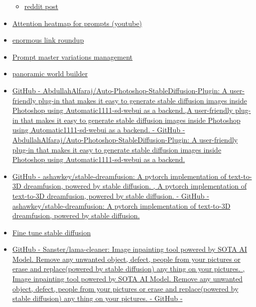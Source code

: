 \begin{itemize}
\begin{itemize}
  \item
    \href{https://www.reddit.com/r/StableDiffusion/comments/10tjzmf/instructpix2pix_is_built_straight_into_the/}{reddit
    post}
  \end{itemize}
\item
  \href{https://www.youtube.com/watch?v=XiKyEKJrTLQ}{Attention heatmap
  for prompts (youtube)}
\item
  \href{https://rentry.org/RentrySD/}{enormous link roundup}
\item
  \href{https://github.com/hoblin/prompt-master}{Prompt master
  variations management}
\item
  \href{https://huggingface.co/congazverse/worldBuilder}{panoramic world
  builder}
\item
  \href{https://github.com/abdullahalfaraj/auto-photoshop-stablediffusion-plugin}{GitHub
  - AbdullahAlfaraj/Auto-Photoshop-StableDiffusion-Plugin: A
  user-friendly plug-in that makes it easy to generate stable diffusion
  images inside Photoshop using Automatic1111-sd-webui as a backend.,A
  user-friendly plug-in that makes it easy to generate stable diffusion
  images inside Photoshop using Automatic1111-sd-webui as a backend. -
  GitHub - AbdullahAlfaraj/Auto-Photoshop-StableDiffusion-Plugin: A
  user-friendly plug-in that makes it easy to generate stable diffusion
  images inside Photoshop using Automatic1111-sd-webui as a backend.}
\item
  \href{https://github.com/ashawkey/stable-dreamfusion}{GitHub -
  ashawkey/stable-dreamfusion: A pytorch implementation of text-to-3D
  dreamfusion, powered by stable diffusion. , A pytorch implementation
  of text-to-3D dreamfusion, powered by stable diffusion. - GitHub -
  ashawkey/stable-dreamfusion: A pytorch implementation of text-to-3D
  dreamfusion, powered by stable diffusion.}
\item
  \href{https://github.com/nitrosocke/dreambooth-training-guide/blob/main/readme.md\#how-to-fine-tune-stable-diffusion-20}{Fine
  tune stable diffusion}
\item
  \href{https://github.com/sanster/lama-cleaner}{GitHub -
  Sanster/lama-cleaner: Image inpainting tool powered by SOTA AI Model.
  Remove any unwanted object, defect, people from your pictures or erase
  and replace(powered by stable diffusion) any thing on your pictures. ,
  Image inpainting tool powered by SOTA AI Model. Remove any unwanted
  object, defect, people from your pictures or erase and replace(powered
  by stable diffusion) any thing on your pictures. - GitHub -
}
\end{itemize}
